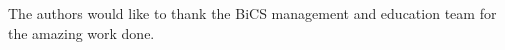 {\color{gray}
The authors would like to thank the BiCS management and education team
for the amazing work done.
}
